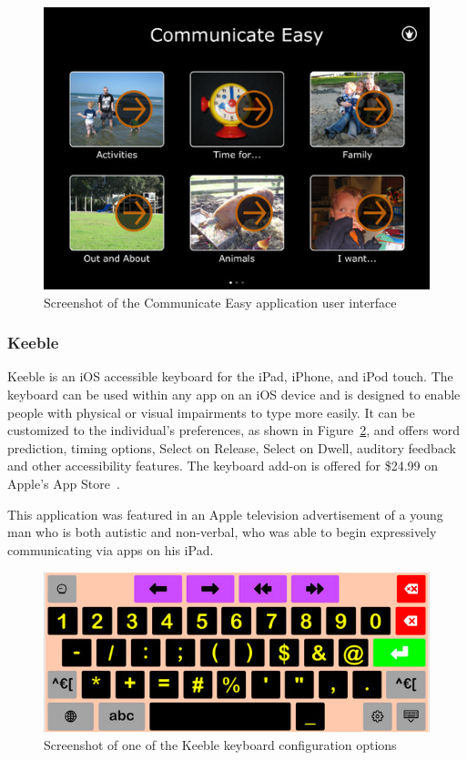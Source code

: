 \begin{figure}[!htb]
\centering
\includegraphics[width=.7\textwidth]{communicateEasy.jpg}
\caption{\label{fig:communicateEasy}Screenshot of the Communicate Easy application user interface}
\end{figure}

\subsubsection{Keeble}
Keeble is an iOS accessible keyboard for the iPad, iPhone, and iPod touch. The keyboard can be used within any app on an iOS device and is designed to enable people with physical or visual impairments to type more easily. It can be customized to the individual's preferences, as shown in Figure~\ref{fig:keeble}, and offers word prediction, timing options, Select on Release, Select on Dwell, auditory feedback and other accessibility features. The keyboard add-on is  offered for \$24.99 on Apple's App Store~\cite{keeble}.

This application was featured in an Apple television advertisement of a young man who is both autistic and non-verbal, who was able to begin expressively communicating via apps on his iPad.

\begin{figure}[!htb]
\centering
\includegraphics[width=1\textwidth]{keeble.png}
\caption{\label{fig:keeble}Screenshot of one of the Keeble keyboard configuration options}
\end{figure}

